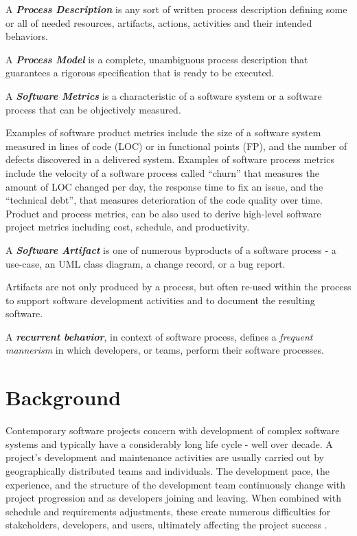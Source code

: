 \begin{defn}\label{def_process_desc}
A \textbf{\textit{Process Description}} is any sort of written process description defining 
some or all of needed resources, artifacts, actions, activities and their intended behaviors.
\end{defn}

\begin{defn}\label{def_process_model}
A \textbf{\textit{Process Model}} is a complete, unambiguous process description that guarantees 
a rigorous specification that is ready to be executed.
\end{defn}

\begin{defn}\label{def_metrics}
A \textbf{\textit{Software Metrics}} is a characteristic of a software system or a software process that can be 
objectively measured.
\end{defn}
Examples of software product metrics include the size of a software system measured in lines of code (LOC) or 
in functional points (FP), and the number of defects discovered in a delivered system. 
Examples of software process metrics include the velocity of a software process called ``churn'' that 
measures the amount of LOC changed per day, the response time to fix an issue, and the ``technical debt'', 
that measures deterioration of the code quality over time. 
Product and process metrics, can be also used to derive high-level software project metrics including cost, 
schedule, and productivity.

\begin{defn}\label{def_artifact}
A \textbf{\textit{Software Artifact}} is one of numerous byproducts of a software process - a use-case, 
an UML class diagram, a change record, or a bug report. 
\end{defn}
Artifacts are not only produced by a process, but often re-used within the process to support 
software development activities and to document the resulting software.

\begin{defn}\label{def_behavior}
A \textbf{\textit{recurrent behavior}}, in context of software process, defines a \textit{frequent mannerism} 
in which developers, or  teams, perform their software processes. 
\end{defn}

%
%
\section{Background}\label{sec_background}
Contemporary software projects concern with development of complex software systems and typically have 
a considerably long life cycle - well over decade.
A project's development and maintenance activities are usually carried out by geographically 
distributed teams and individuals. The development pace, the experience, and the structure of the 
development team continuously change with project progression and as developers joining and leaving. 
When combined with schedule and requirements adjustments, these create numerous difficulties 
for stakeholders, developers, and users, ultimately affecting the project success \cite{citeulike:2207657}. 

